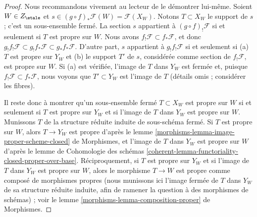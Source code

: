 \begin{proof}
Nous recommandons vivement au lecteur de le démontrer lui-même.
Soient $W \in Z_\etale$ et
$s \in (g \circ f)_*\mathcal{F}(W) = \mathcal{F}(X_W)$.
Notons $T \subset X_W$ le support de $s$ ; c'est un sous-ensemble
fermé. La section $s$ appartient à $(g \circ f)_!\mathcal{F}$
si et seulement si $T$ est propre sur $W$. Nous avons
$f_!\mathcal{F} \subset f_*\mathcal{F}$, et donc
$g_!f_!\mathcal{F} \subset g_!f_*\mathcal{F} \subset g_*f_*\mathcal{F}$.
D'autre part, $s$ appartient à $g_!f_!\mathcal{F}$ si et seulement
si (a) $T$ est propre sur $Y_W$ et (b) le support $T'$ de $s$,
considérée comme section de $f_!\mathcal{F}$, est propre sur $W$.
Si (a) est vérifiée, l'image de $T$ dans $Y_W$ est fermée et, puisque
$f_!\mathcal{F} \subset f_*\mathcal{F}$, nous voyons que
$T' \subset Y_W$ est l'image de $T$ (détails omis ; considérer les fibres).

\medskip\noindent
Il reste donc à montrer qu'un sous-ensemble fermé $T \subset X_W$
est propre sur $W$ si et seulement si $T$ est propre sur $Y_W$
et si l'image de $T$ dans $Y_W$ est propre sur $W$. Munissons $T$
de la structure réduite induite de sous-schéma fermé.
Si $T$ est propre sur $W$, alors $T \to Y_W$ est propre d'après le
lemme \ref{morphisms-lemma-image-proper-scheme-closed} de Morphismes,
et l'image de $T$ dans $Y_W$ est propre sur $W$ d'après le
lemme de Cohomologie des schémas
\ref{coherent-lemma-functoriality-closed-proper-over-base}.
Réciproquement, si $T$ est propre sur $Y_W$
et si l'image de $T$ dans $Y_W$ est propre sur $W$,
alors le morphisme $T \to W$ est propre comme composé
de morphismes propres (nous munissons ici l'image fermée de $T$
dans $Y_W$ de sa structure réduite induite, afin de ramener la
question à des morphismes de schémas) ; voir le
lemme \ref{morphisms-lemma-composition-proper} de Morphismes.
\end{proof}

